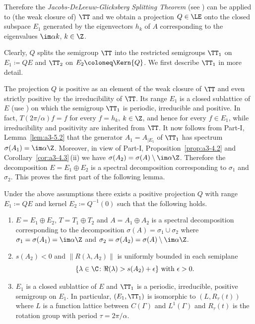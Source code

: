 Therefore the \emph{Jacobs-DeLeeuw-Glicksberg Splitting Theorem} (see \textcite[Chapter 2, Theorem 4.4 and 4.5]{krengel:1985}) can be applied to (the weak closure of) $\TT$ and we obtain a projection $Q \in \LE$ onto the closed subspace $E_{1}$ generated by the eigenvectors $h_{k}$ of\/ $A$ corresponding to the eigenvalues $\im\alpha k$, $k \in \Z$.

Clearly, $Q$ splits the semigroup $\TT$ into the restricted semigroups $\TT_{1}$ on $E_{1} \coloneq QE$ and $\TT_{2}$ on $E_{2} \coloneq \Kern{Q}$.
We first describe $\TT_{1}$ in more detail.

The projection $Q$ is positive as an element of the weak closure of\/ $\TT$ and even strictly positive by the irreducibility of\/ $\TT$.
Its range $E_{1}$ is a closed sublattice of\/ $E$ (use \textcite[Proposition III.11.5]{schaefer:1974}) on which the semigroup $\TT_{1}$ is periodic, irreducible and positive.
In fact, $T(2\pi/\alpha)f = f$ for every $f = h_{k}$, $k \in \Z$, and hence for every $f \in E_{1}$, while irreducibility and positivity are inherited from $\TT$.
It now follows from 
Part-I, Lemma~\ref{lem:a3-5.2}
that the generator $A_{1} = A_{|E_{1}}$ of\/ $\TT_{1}$ has spectrum $\sigma(A_{1}) = \im\alpha\Z$.
Moreover, in view of 
Part-I, Proposition~\ref{prop:a3-4.2} and Corollary~\ref{cor:a3-4.3}\,(ii) 
we have $\sigma(A_{2}) = \sigma(A) \setminus \im\alpha\Z$.
Therefore the decomposition $E = E_{1} \oplus E_{2}$ is a spectral decomposition corresponding to $\sigma_{1}$ and $\sigma_{2}$.
This proves the first part of the following lemma.
\begin{lemma}\label{lem:c4-2.12}%
Under the above assumptions there exists a positive projection $Q$ with range $E_{1} \coloneq QE$ and kernel $E_{2} \coloneq Q^{-1}(0)$ such that the following holds.
\begin{enumerate}[\upshape (i)]
\item \label{lem:c4-2.12-1}
$E = E_{1} \oplus E_{2}$, $T = T_{1} \oplus T_{2}$ and $A = A_{1} \oplus A_{2}$ is a spectral decomposition corresponding to the decomposition $\sigma(A) = \sigma_{1} \cup \sigma_{2}$ where $\sigma_{1} = \sigma(A_{1}) = \im\alpha\Z$ and $\sigma_{2} = \sigma(A_{2}) = \sigma(A) \setminus \im\alpha\Z$.

\item \label{lem:c4-2.12-2}
$s(A_{2}) < 0$ and $\|R(\lambda,A_{2})\|$ is uniformly bounded in each semiplane
\[
\{\lambda \in \C \colon \Re(\lambda) > s(A_{2}) + \epsilon\} \text{ with } \epsilon > 0.
\]

\item \label{lem:c4-2.12-3}
$E_{1}$ is a closed sublattice of\/ $E$ and $\TT_{1}$ is a periodic, irreducible, positive semigroup on $E_{1}$.
In particular, $(E_{1},\TT_{1})$ is isomorphic to $(L,R_{\tau}(t))$ where $L$ is a function lattice between $C(\Gamma)$ and $L^{1}(\Gamma)$ and $R_{\tau}(t)$ is the rotation group with period $\tau = 2\pi/\alpha$.
\end{enumerate}
\end{lemma}
